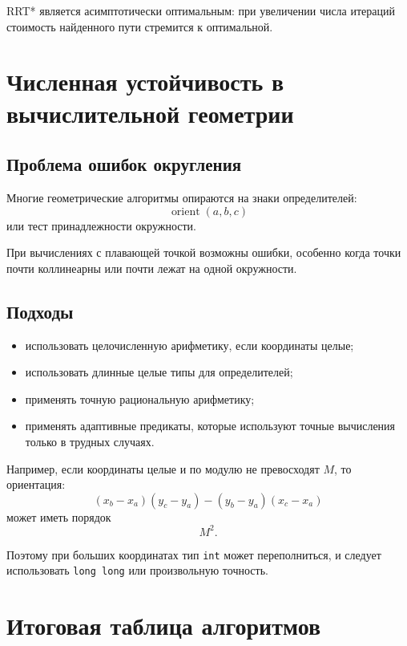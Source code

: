 \documentclass[12pt,a4paper]{article}
\begin{document}
RRT* является асимптотически оптимальным: при увеличении числа итераций стоимость найденного пути стремится к оптимальной.

\section{Численная устойчивость в вычислительной геометрии}

\subsection{Проблема ошибок округления}

Многие геометрические алгоритмы опираются на знаки определителей:
\[
\operatorname{orient}(a,b,c)
\]
или тест принадлежности окружности.

При вычислениях с плавающей точкой возможны ошибки, особенно когда точки почти коллинеарны или почти лежат на одной окружности.

\subsection{Подходы}

\begin{itemize}
    \item использовать целочисленную арифметику, если координаты целые;
    \item использовать длинные целые типы для определителей;
    \item применять точную рациональную арифметику;
    \item применять адаптивные предикаты, которые используют точные вычисления только в трудных случаях.
\end{itemize}

Например, если координаты целые и по модулю не превосходят \(M\), то ориентация:
\[
(x_b-x_a)(y_c-y_a)-(y_b-y_a)(x_c-x_a)
\]
может иметь порядок
\[
M^2.
\]

Поэтому при больших координатах тип \texttt{int} может переполниться, и следует использовать \texttt{long long} или произвольную точность.

\section{Итоговая таблица алгоритмов}
\end{document}
